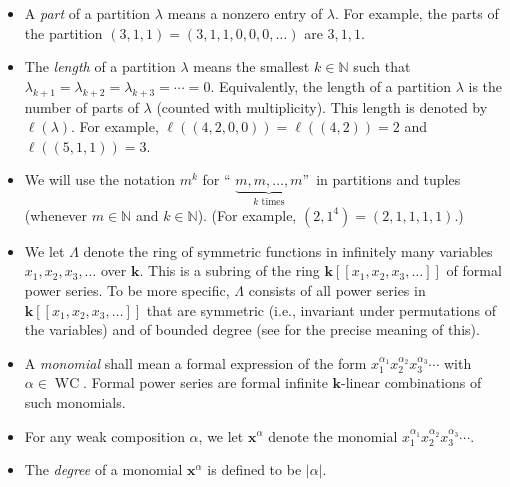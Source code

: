 \documentclass[numbers=enddot,12pt,final,onecolumn,notitlepage]{scrartcl}%
\theoremstyle{definition}
\begin{document}
\begin{itemize}
As a consequence of this, an $n$-tuple $\left(  \lambda_{1},\lambda_{2}%
,\ldots,\lambda_{n}\right)  \in\mathbb{Z}^{n}$ (for any given $n\in\mathbb{N}%
$) is a partition if and only if it satisfies $\lambda_{1}\geq\lambda_{2}%
\geq\cdots\geq\lambda_{n}\geq0$.

\item A \emph{part} of a partition $\lambda$ means a nonzero entry of
$\lambda$. For example, the parts of the partition $\left(  3,1,1\right)
=\left(  3,1,1,0,0,0,\ldots\right)  $ are $3,1,1$.

\item The \emph{length} of a partition $\lambda$ means the smallest
$k\in\mathbb{N}$ such that $\lambda_{k+1}=\lambda_{k+2}=\lambda_{k+3}%
=\cdots=0$. Equivalently, the length of a partition $\lambda$ is the number of
parts of $\lambda$ (counted with multiplicity). This length is denoted by
$\ell\left(  \lambda\right)  $. For example, $\ell\left(  \left(
4,2,0,0\right)  \right)  =\ell\left(  \left(  4,2\right)  \right)  =2$ and
$\ell\left(  \left(  5,1,1\right)  \right)  =3$.

\item We will use the notation $m^{k}$ for \textquotedblleft%
$\underbrace{m,m,\ldots,m}_{k\text{ times}}$\textquotedblright\ in partitions
and tuples (whenever $m\in\mathbb{N}$ and $k\in\mathbb{N}$). (For example,
$\left(  2,1^{4}\right)  =\left(  2,1,1,1,1\right)  $.)

\item We let $\Lambda$ denote the ring of symmetric functions in infinitely
many variables $x_{1},x_{2},x_{3},\ldots$ over $\mathbf{k}$. This is a subring
of the ring $\mathbf{k}\left[  \left[  x_{1},x_{2},x_{3},\ldots\right]
\right]  $ of formal power series. To be more specific, $\Lambda$ consists of
all power series in $\mathbf{k}\left[  \left[  x_{1},x_{2},x_{3}%
,\ldots\right]  \right]  $ that are symmetric (i.e., invariant under
permutations of the variables) and of bounded degree (see \cite[\S 2.1]%
{GriRei} for the precise meaning of this).

\item A \emph{monomial} shall mean a formal expression of the form
$x_{1}^{\alpha_{1}}x_{2}^{\alpha_{2}}x_{3}^{\alpha_{3}}\cdots$ with $\alpha
\in\operatorname*{WC}$. Formal power series are formal infinite $\mathbf{k}%
$-linear combinations of such monomials.

\item For any weak composition $\alpha$, we let $\mathbf{x}^{\alpha}$ denote
the monomial $x_{1}^{\alpha_{1}}x_{2}^{\alpha_{2}}x_{3}^{\alpha_{3}}\cdots$.

\item The \emph{degree} of a monomial $\mathbf{x}^{\alpha}$ is defined to be
$\left\vert \alpha\right\vert $.
\end{itemize}
\end{document}
